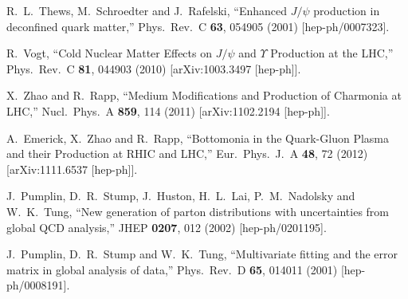 \documentclass[aps,prc,preprint,superscriptaddress,showpacs,showkeys]{revtex4-1}
\begin{document}
\begin{thebibliography}{100}
  R.~L.~Thews, M.~Schroedter and J.~Rafelski,
  ``Enhanced $J/\psi$ production in deconfined quark matter,''
  Phys.\ Rev.\ C {\bf 63}, 054905 (2001)
  [hep-ph/0007323].


  R.~Vogt,
  ``Cold Nuclear Matter Effects on $J/\psi$ and $\Upsilon$ Production at the LHC,''
  Phys.\ Rev.\ C {\bf 81}, 044903 (2010)
  [arXiv:1003.3497 [hep-ph]].


  X.~Zhao and R.~Rapp,
  ``Medium Modifications and Production of Charmonia at LHC,''
  Nucl.\ Phys.\ A {\bf 859}, 114 (2011)
  [arXiv:1102.2194 [hep-ph]].

  A.~Emerick, X.~Zhao and R.~Rapp,
  ``Bottomonia in the Quark-Gluon Plasma and their Production at RHIC and LHC,''
  Eur.\ Phys.\ J.\ A {\bf 48}, 72 (2012)
  [arXiv:1111.6537 [hep-ph]].



  J.~Pumplin, D.~R.~Stump, J.~Huston, H.~L.~Lai, P.~M.~Nadolsky and W.~K.~Tung,
  ``New generation of parton distributions with uncertainties from global QCD analysis,''
  JHEP {\bf 0207}, 012 (2002)
  [hep-ph/0201195].

 
  J.~Pumplin, D.~R.~Stump and W.~K.~Tung,
  ``Multivariate fitting and the error matrix in global analysis of data,''
  Phys.\ Rev.\ D {\bf 65}, 014011 (2001)
  [hep-ph/0008191].



\end{thebibliography}
\end{document}
